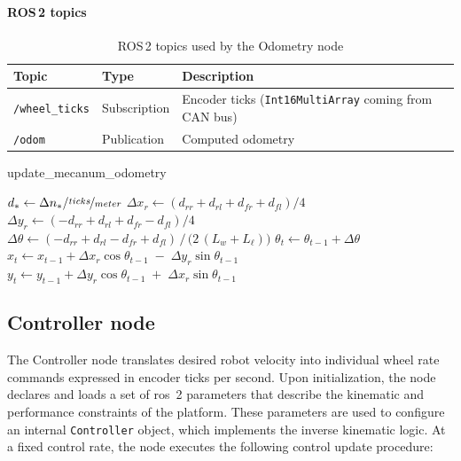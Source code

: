 \paragraph*{ROS\,2 topics}
\begin{table}[H]
  \centering
  \begin{tabular}{lll}
    \toprule
    \textbf{Topic}         & \textbf{Type}                                                 & \textbf{Description} \\
    \midrule
    \texttt{/wheel\_ticks} & Subscription
                           & Encoder ticks (\texttt{Int16MultiArray} coming from CAN bus)                        \\
    \texttt{/odom}         & Publication
                           & Computed odometry                                                                    \\
    \bottomrule
  \end{tabular}
  \caption{ROS\,2 topics used by the Odometry node}
  \label{tab:odo-topics}
\end{table}

\begin{algorithm}[H]
  \caption{update\_mecanum\_odometry}
  \begin{algorithmic}[1]
    \State $d_{*} \gets \Delta n_{*} / \nicefrac{ticks}{meter}$
    \State $\Delta x_r \gets (d_{rr} + d_{rl} + d_{fr} + d_{fl}) / 4$
    \State $\Delta y_r \gets (-d_{rr} + d_{rl} + d_{fr} - d_{fl}) / 4$
    \State $\Delta \theta \gets (-d_{rr} + d_{rl} - d_{fr} + d_{fl}) \,/\, \bigl(2\,(L_w + L_\ell)\bigr)$
    \State $\theta_{t} \gets \theta_{t-1} + \Delta \theta$
    \State $x_{t} \gets x_{t-1} + \Delta x_r \cos\theta_{t-1} \;-\; \Delta y_r \sin\theta_{t-1}$
    \State $y_{t} \gets y_{t-1} + \Delta y_r \cos\theta_{t-1} \;+\; \Delta x_r \sin\theta_{t-1}$
    \EndFunction
  \end{algorithmic}
\end{algorithm}

\subsection{Controller node}

The Controller node translates desired robot velocity into individual wheel rate commands expressed in encoder ticks per second. Upon initialization, the node declares and loads a set of \gls{ros}~2 parameters that describe the kinematic and performance constraints of the platform. These parameters are used to configure an internal \texttt{Controller} object, which implements the inverse kinematic logic. At a fixed control rate, the node executes the following control update procedure:

